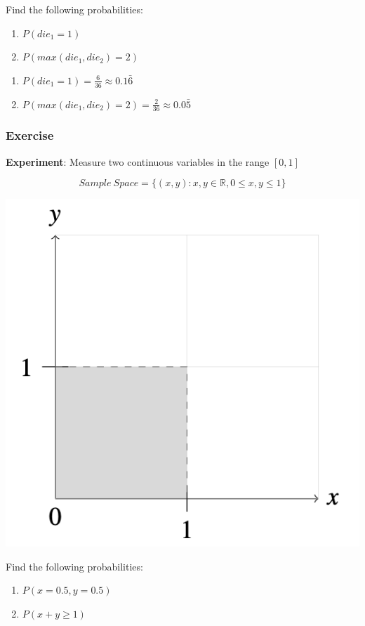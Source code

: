 \documentclass[
  letterpaper,
  DIV=11,
  numbers=noendperiod]{scrreprt}
\providecommand{\tightlist}{%
  \setlength{\itemsep}{0pt}\setlength{\parskip}{0pt}}\usepackage{longtable,booktabs,array}
\begin{document}
Find the following probabilities:

\begin{enumerate}
\def\labelenumi{\arabic{enumi}.}
\tightlist
\item
  \(P(die_1 = 1)\)
\item
  \(P(max(die_1, die_2) = 2)\)
\end{enumerate}

\begin{tcolorbox}[enhanced jigsaw, opacityback=0, left=2mm, breakable, bottomtitle=1mm, rightrule=.15mm, colframe=quarto-callout-tip-color-frame, titlerule=0mm, colback=white, opacitybacktitle=0.6, toptitle=1mm, title=\textcolor{quarto-callout-tip-color}{\faLightbulb}\hspace{0.5em}{Solution}, colbacktitle=quarto-callout-tip-color!10!white, bottomrule=.15mm, arc=.35mm, coltitle=black, leftrule=.75mm, toprule=.15mm]

\begin{enumerate}
\def\labelenumi{\arabic{enumi}.}
\tightlist
\item
  \(P(die_1 = 1) = \frac{6}{36} \approx 0.1\bar{6}\)
\item
  \(P(max(die_1, die_2) = 2) = \frac{2}{36} \approx 0.0\bar{5}\)
\end{enumerate}

\end{tcolorbox}

\subsubsection{Exercise}\label{exercise-5}

\textbf{Experiment}: Measure two continuous variables in the range
\([0,1]\)

\[ 
Sample\ Space = \{ (x, y) : x,y \in \mathbb{R}, 0 \leq x, y \leq 1  \} 
\]

\includegraphics[width=0.3\linewidth,height=\textheight,keepaspectratio]{lecture2/images/continuous-axiomatic.png}

Find the following probabilities:

\begin{enumerate}
\def\labelenumi{\arabic{enumi}.}
\tightlist
\item
  \(P(x = 0.5 , y = 0.5)\)
\item
  \(P(x+y \geq 1)\)
\end{enumerate}
\end{document}
